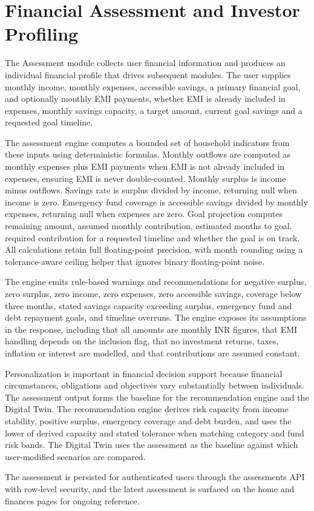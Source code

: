 \section{Financial Assessment and Investor Profiling}

The Assessment module collects user financial information and produces an individual financial profile that drives subsequent modules. The user supplies monthly income, monthly expenses, accessible savings, a primary financial goal, and optionally monthly EMI payments, whether EMI is already included in expenses, monthly savings capacity, a target amount, current goal savings and a requested goal timeline.

The assessment engine computes a bounded set of household indicators from these inputs using deterministic formulas. Monthly outflows are computed as monthly expenses plus EMI payments when EMI is not already included in expenses, ensuring EMI is never double-counted. Monthly surplus is income minus outflows. Savings rate is surplus divided by income, returning null when income is zero. Emergency fund coverage is accessible savings divided by monthly expenses, returning null when expenses are zero. Goal projection computes remaining amount, assumed monthly contribution, estimated months to goal, required contribution for a requested timeline and whether the goal is on track. All calculations retain full floating-point precision, with month rounding using a tolerance-aware ceiling helper that ignores binary floating-point noise.

The engine emits rule-based warnings and recommendations for negative surplus, zero surplus, zero income, zero expenses, zero accessible savings, coverage below three months, stated savings capacity exceeding surplus, emergency fund and debt repayment goals, and timeline overruns. The engine exposes its assumptions in the response, including that all amounts are monthly INR figures, that EMI handling depends on the inclusion flag, that no investment returns, taxes, inflation or interest are modelled, and that contributions are assumed constant.

Personalization is important in financial decision support because financial circumstances, obligations and objectives vary substantially between individuals. The assessment output forms the baseline for the recommendation engine and the Digital Twin. The recommendation engine derives risk capacity from income stability, positive surplus, emergency coverage and debt burden, and uses the lower of derived capacity and stated tolerance when matching category and fund risk bands. The Digital Twin uses the assessment as the baseline against which user-modified scenarios are compared.

The assessment is persisted for authenticated users through the assessments API with row-level security, and the latest assessment is surfaced on the home and finances pages for ongoing reference.